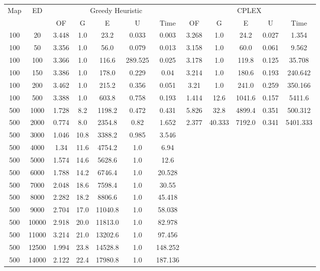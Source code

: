 \begin{table}[htb]
	\centering
	\begin{tabular}{|c|c|c|c|c|c|c|c|c|c|c|c|}
		\hline
		\multirow{2}{*}{Map} & \multirow{2}{*}{ED} & \multicolumn{5}{c|}{Greedy Heuristic} & \multicolumn{5}{c|}{CPLEX}\\ 
		\cline{3-12}
&& OF & G & E & U & Time & OF & G & E & U & Time\\ 
		\hline
		100 & 20 & 3.448 & 1.0 & 23.2 & 0.033 & 0.003 & 3.268 & 1.0 & 24.2 & 0.027 & 1.354 \\ 
		100 & 50 & 3.356 & 1.0 & 56.0 & 0.079 & 0.013 & 3.158 & 1.0 & 60.0 & 0.061 & 9.562 \\ 
		100 & 100 & 3.366 & 1.0 & 116.6 & 289.525 & 0.025 & 3.178 & 1.0 & 119.8 & 0.125 & 35.708 \\ 
		100 & 150 & 3.386 & 1.0 & 178.0 & 0.229 & 0.04 & 3.214 & 1.0 & 180.6 & 0.193 & 240.642 \\ 
		100 & 200 & 3.462 & 1.0 & 215.2 & 0.356 & 0.051 & 3.21 & 1.0 & 241.0 & 0.259 & 350.166 \\ 
		100 & 500 & 3.388 & 1.0 & 603.8 & 0.758 & 0.193 & 1.414 & 12.6 & 1041.6 & 0.157 & 5411.6 \\ 
		500 & 1000 & 1.728 & 8.2 & 1198.2 & 0.472 & 0.431 & 5.826 & 32.8 & 4899.4 & 0.351 & 500.312 \\ 
		500 & 2000 & 0.774 & 8.0 & 2354.8 & 0.82 & 1.652 & 2.377 & 40.333 & 7192.0 & 0.341 & 5401.333 \\ 
		500 & 3000 & 1.046 & 10.8 & 3388.2 & 0.985 & 3.546 & & & & &  \\ 
		500 & 4000 & 1.34 & 11.6 & 4754.2 & 1.0 & 6.94 & & & & &  \\ 
		500 & 5000 & 1.574 & 14.6 & 5628.6 & 1.0 & 12.6 & & & & &  \\ 
		500 & 6000 & 1.788 & 14.2 & 6746.4 & 1.0 & 20.528 & & & & &  \\ 
		500 & 7000 & 2.048 & 18.6 & 7598.4 & 1.0 & 30.55 & & & & &  \\ 
		500 & 8000 & 2.282 & 18.2 & 8806.6 & 1.0 & 45.418 & & & & &  \\ 
		500 & 9000 & 2.704 & 17.0 & 11040.8 & 1.0 & 58.038 & & & & &  \\ 
		500 & 10000 & 2.918 & 20.0 & 11813.0 & 1.0 & 82.978 & & & & &  \\ 
		500 & 11000 & 3.214 & 21.0 & 13202.6 & 1.0 & 97.456 & & & & &  \\ 
		500 & 12500 & 1.994 & 23.8 & 14528.8 & 1.0 & 148.252 & & & & &  \\ 
		500 & 14000 & 2.122 & 22.4 & 17980.8 & 1.0 & 187.136 & & & & &  \\ 

\end{tabular}
\end{table}
